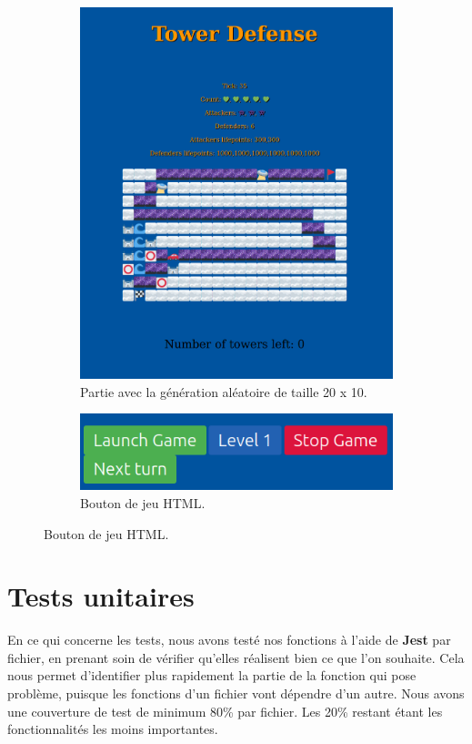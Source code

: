 \documentclass{article}
\begin{document}
\begin{figure}[!h]
    \centering
    \begin{subfigure}{0.6\textwidth}
    	\includegraphics[width=\textwidth]{TowerDRandom.png}
   	 \caption{Partie avec la génération aléatoire de taille 20 x 10.}
	    \label{fig:random_html}
    \end{subfigure}
    \hfill
    \begin{subfigure}{0.6\textwidth}
        \includegraphics[width=\textwidth]{buttonHTML.png}
    	\caption{Bouton de jeu HTML.}
            \label{fig:buttonHTML}
    \end{subfigure}
\end{figure}


\newpage
\section{Tests unitaires}
En ce qui concerne les tests, nous avons testé nos fonctions à l'aide de \textbf{Jest} par fichier, en prenant soin de vérifier qu'elles réalisent bien ce que l'on souhaite. Cela nous permet d'identifier plus rapidement la partie de la fonction qui pose problème, puisque les fonctions d'un fichier vont dépendre d'un autre. Nous avons une couverture de test de minimum 80\% par fichier. Les 20\% restant étant les fonctionnalités les moins importantes.
\end{document}
